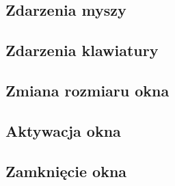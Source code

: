 \subsection{Zdarzenia myszy}


\subsection{Zdarzenia klawiatury}


\subsection{Zmiana rozmiaru okna}


\subsection{Aktywacja okna}


\subsection{Zamknięcie okna}

